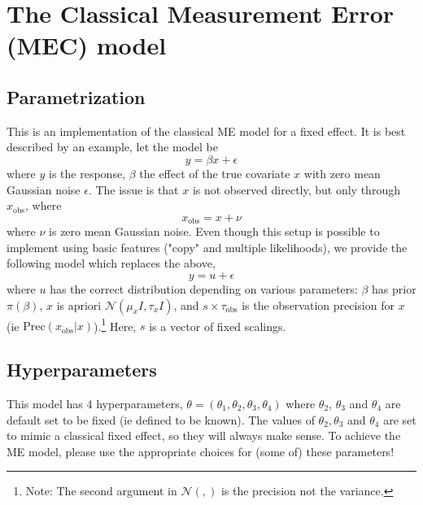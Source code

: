 \documentclass[a4paper,11pt]{article}
\begin{document}
\section*{The Classical Measurement Error (MEC) model}

\subsection*{Parametrization}

This is an implementation of the classical ME model for a fixed
effect. It is best described by an example, let  the model be
\begin{displaymath}
    y = \beta x + \epsilon{}
\end{displaymath}
where $y$ is the response, $\beta$ the effect of the true covariate
$x$ with zero mean Gaussian noise $\epsilon$. The issue is that $x$ is
not observed directly, but only through $x_{\text{obs}}$, where
\begin{displaymath}
    x_{\text{obs}} = x + \nu{}
\end{displaymath}
where $\nu$ is zero mean Gaussian noise. Even though this setup is
possible to implement using basic features ("copy" and multiple
likelihoods), we provide the following model which replaces the above,
\begin{displaymath}
    y = u + \epsilon{}
\end{displaymath}
where $u$ has the correct distribution depending on various parameters:
$\beta$ has prior $\pi(\beta)$, $x$ is apriori ${\mathcal N}(\mu_{x}
{I}, \tau_{x} {I})$, and $s\times\tau_{\text{obs}}$ is the observation
precision for $x$ (ie $\text{Prec}(x_{\text{obs}}|x)$).\footnote{Note:
    The second argument in ${\mathcal N}(,)$ is the precision not the
    variance.} Here, $s$ is a vector of fixed scalings.



\subsection*{Hyperparameters}

This model has 4 hyperparameters, $\theta = (\theta_{1}, \theta_{2},
\theta_{3}, \theta_{4})$ where $\theta_{2}$, $\theta_{3}$ and
$\theta_{4}$ are default set to be fixed (ie defined to be known). The
values of $\theta_{2}, \theta_{3}$ and $\theta_{4}$ are set to mimic a
classical fixed effect, so they will always make sense. To achieve the
ME model, please use the appropriate choices for
(some of) these parameters!
\end{document}
